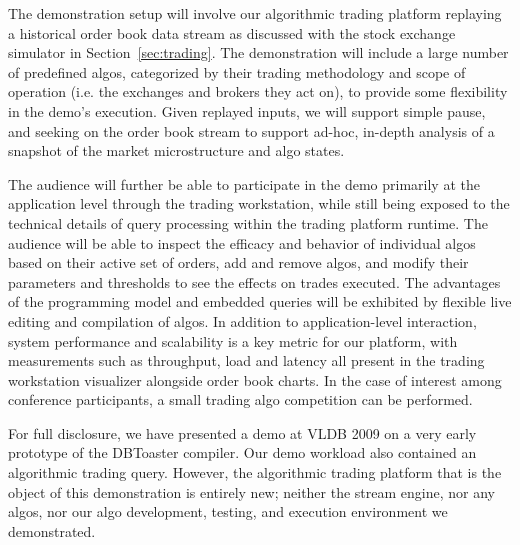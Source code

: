 The demonstration setup will involve our algorithmic trading platform replaying
a historical order book data stream as discussed with the stock exchange
simulator in Section~\ref{sec:trading}. The demonstration will include a large
number of predefined algos, categorized by their trading methodology and scope
of operation (i.e. the exchanges and brokers they act on), to provide some
flexibility in the demo's execution. Given replayed inputs, we will
support simple pause, and seeking on the order book stream to support ad-hoc,
in-depth analysis of a snapshot of the market microstructure and algo states.

The audience will further be able to participate in the demo primarily at the
application level through the trading workstation, while still being exposed to
the technical details of query processing within the trading platform runtime.
The audience will be able to inspect the efficacy and behavior of individual
algos based on their active set of orders, add and remove algos, and
modify
their parameters and thresholds to see the effects on trades executed. The
advantages of the programming model and embedded queries will be exhibited by
flexible live editing and compilation of algos. In addition to
application-level interaction, system performance and scalability is a key
metric for our platform, with measurements such as throughput, load and latency
all present in the trading workstation visualizer alongside order book charts.
In the case of interest among conference participants, a small trading algo
competition can be performed.

For full disclosure, we have presented a demo at VLDB 2009 on a very early
prototype of the DBToaster compiler. Our demo workload also contained
an algorithmic trading query. However, the algorithmic trading platform
that is the object of this demonstration is entirely new; neither the
stream engine, nor any algos, nor our algo development, testing, and execution
environment we demonstrated.



